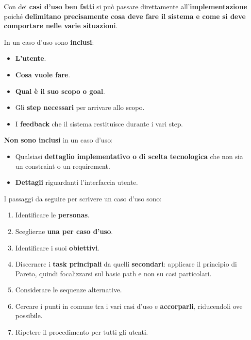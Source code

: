 \documentclass[a4paper,11pt,oneside]{book}
\begin{document}
Con dei \textbf{casi d'uso ben fatti} si può passare direttamente all'\textbf{implementazione} poiché \textbf{delimitano precisamente cosa deve fare il sistema e come si deve comportare nelle varie situazioni}.

In un caso d'uso sono \textbf{inclusi}:

\begin{multicols}{2}
	\begin{itemize}
		\item \textbf{L'utente}.
		\item \textbf{Cosa vuole fare}.
		\item \textbf{Qual è il suo scopo o goal}.
		\item Gli \textbf{step necessari} per arrivare allo scopo.
		\item I \textbf{feedback} che il sistema restituisce durante i vari step.
	\end{itemize}
\end{multicols}

\textbf{Non sono inclusi} in un caso d'uso:

\begin{multicols}{2}
	\begin{itemize}
		\item Qualsiasi \textbf{dettaglio implementativo o di scelta tecnologica} che non sia un constraint o un requirement.
		\item \textbf{Dettagli} riguardanti l'interfaccia utente.
	\end{itemize}
\end{multicols}

I passaggi da seguire per scrivere un caso d'uso sono:

\begin{multicols}{2}


	\begin{enumerate}
		\item Identificare le \textbf{personas}.
		\item Sceglierne \textbf{una per caso d'uso}.
		\item Identificare i suoi \textbf{obiettivi}.
		\item Discernere i \textbf{task principali} da quelli \textbf{secondari}: applicare il principio di Pareto, quindi focalizzarsi sul basic path e non su casi particolari.
		\item Considerare le sequenze alternative.
		\item Cercare i punti in comune tra i vari casi d'uso e \textbf{accorparli}, riducendoli ove possibile.
		\item Ripetere il procedimento per tutti gli utenti.
	\end{enumerate}
\end{multicols}
\end{document}
